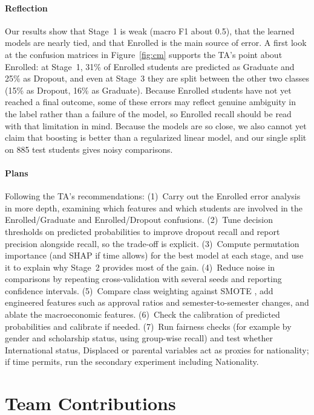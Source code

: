 \documentclass[11pt]{article}
\begin{document}
\paragraph{Reflection} Our results show that Stage~1 is weak (macro F1 about 0.5), that the learned models are nearly tied, and that Enrolled is the main source of error. A first look at the confusion matrices in Figure~\ref{fig:cm} supports the TA's point about Enrolled: at Stage~1, 31\% of Enrolled students are predicted as Graduate and 25\% as Dropout, and even at Stage~3 they are split between the other two classes (15\% as Dropout, 16\% as Graduate). Because Enrolled students have not yet reached a final outcome, some of these errors may reflect genuine ambiguity in the label rather than a failure of the model, so Enrolled recall should be read with that limitation in mind. Because the models are so close, we also cannot yet claim that boosting is better than a regularized linear model, and our single split on 885 test students gives noisy comparisons.

\paragraph{Plans} Following the TA's recommendations: (1)~Carry out the Enrolled error analysis in more depth, examining which features and which students are involved in the Enrolled/Graduate and Enrolled/Dropout confusions. (2)~Tune decision thresholds on predicted probabilities to improve dropout recall and report precision alongside recall, so the trade-off is explicit. (3)~Compute permutation importance (and SHAP if time allows) for the best model at each stage, and use it to explain why Stage~2 provides most of the gain. (4)~Reduce noise in comparisons by repeating cross-validation with several seeds and reporting confidence intervals. (5)~Compare class weighting against SMOTE \citep{chawla2002}, add engineered features such as approval ratios and semester-to-semester changes, and ablate the macroeconomic features. (6)~Check the calibration of predicted probabilities and calibrate if needed. (7)~Run fairness checks (for example by gender and scholarship status, using group-wise recall) and test whether International status, Displaced or parental variables act as proxies for nationality; if time permits, run the secondary experiment including Nationality.
\section*{Team Contributions}
\end{document}
